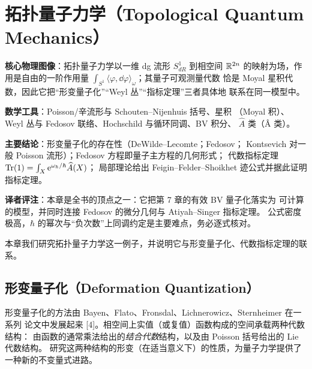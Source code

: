 
\section{拓扑量子力学（Topological Quantum Mechanics）}

\begin{keypoints}
  \item \textbf{核心物理图像}：拓扑量子力学以一维 dg 流形 $S^{1}_{dR}$ 到相空间
        $\mathbb{R}^{2n}$ 的映射为场，作用是自由的一阶作用量
        $\int_{S^{1}}\langle\varphi,\dd\varphi\rangle_{\omega}$；其量子可观测量代数
        恰是 Moyal 星积代数，因此它把“形变量子化”“Weyl 丛”“指标定理”三者具体地
        联系在同一模型中。
  \item \textbf{数学工具}：Poisson/辛流形与 Schouten--Nijenhuis 括号、星积
        （Moyal 积）、Weyl 丛与 Fedosov 联络、Hochschild 与循环同调、BV 积分、
        $\widehat{A}$ 类（Â 类）。
  \item \textbf{主要结论}：形变量子化的存在性（DeWilde--Lecomte；Fedosov；
        Kontsevich 对一般 Poisson 流形）；Fedosov 方程即量子主方程的几何形式；
        代数指标定理 $\operatorname{Tr}(1)=\int_{X}\mathrm{e}^{\omega_{\hbar}/\hbar}\widehat{A}(X)$；
        局部理论给出 Feigin--Felder--Shoikhet 迹公式并据此证明指标定理。
  \item \textbf{译者评注}：本章是全书的顶点之一：它把第 7 章的有效 BV 量子化落实为
        可计算的模型，并同时连接 Fedosov 的微分几何与 Atiyah--Singer 指标定理。
        公式密度极高，$\hbar$ 的幂次与“负次数”上同调约定是主要难点，务必逐式核对。
\end{keypoints}

本章我们研究拓扑量子力学这一例子，并说明它与形变量子化、代数指标定理的联系。

\subsection{形变量子化（Deformation Quantization）}

形变量子化的方法由 Bayen、Flato、Fronsdal、Lichnerowicz、Sternheimer 在一系列
论文中发展起来 \textup{[4]}。相空间上实值（或复值）函数构成的空间承载两种代数结构：
由函数的通常乘法给出的\emph{结合代数}结构，以及由 Poisson 括号给出的 Lie 代数结构。
研究这两种结构的形变（在适当意义下）的性质，为量子力学提供了一种新的不变量式进路。

